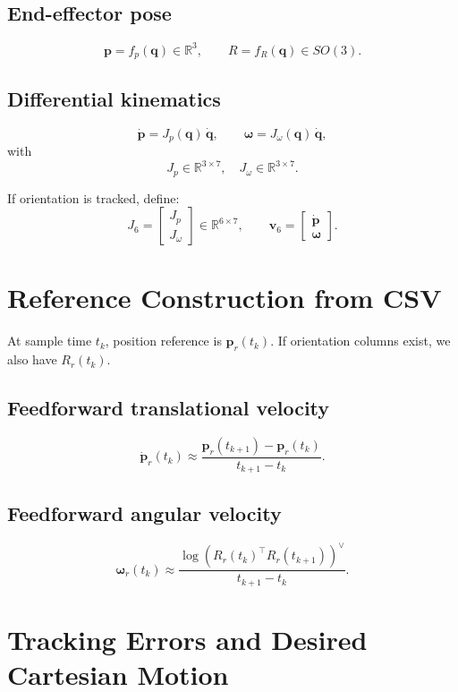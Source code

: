 \documentclass[11pt,a4paper]{article}
\begin{document}
\subsection{End-effector pose}
\[
\mathbf{p}=f_p(\mathbf{q})\in\mathbb{R}^3,\qquad
R=f_R(\mathbf{q})\in SO(3).
\]

\subsection{Differential kinematics}
\[
\dot{\mathbf{p}} = J_p(\mathbf{q})\,\dot{\mathbf{q}},\qquad
\bm{\omega}=J_\omega(\mathbf{q})\,\dot{\mathbf{q}},
\]
with
\[
J_p\in\mathbb{R}^{3\times 7},\quad
J_\omega\in\mathbb{R}^{3\times 7}.
\]

If orientation is tracked, define:
\[
J_6=\begin{bmatrix}J_p\\J_\omega\end{bmatrix}\in\mathbb{R}^{6\times 7},\qquad
\mathbf{v}_6=\begin{bmatrix}\dot{\mathbf{p}}\\\bm{\omega}\end{bmatrix}.
\]

\section{Reference Construction from CSV}

At sample time \(t_k\), position reference is \(\mathbf{p}_r(t_k)\). If orientation columns exist, we also have \(R_r(t_k)\).

\subsection{Feedforward translational velocity}
\[
\dot{\mathbf{p}}_r(t_k)\approx
\frac{\mathbf{p}_r(t_{k+1})-\mathbf{p}_r(t_k)}{t_{k+1}-t_k}.
\]

\subsection{Feedforward angular velocity}
\[
\bm{\omega}_r(t_k)\approx
\frac{\log\!\left(R_r(t_k)^\top R_r(t_{k+1})\right)^\vee}{t_{k+1}-t_k}.
\]

\section{Tracking Errors and Desired Cartesian Motion}
\end{document}
